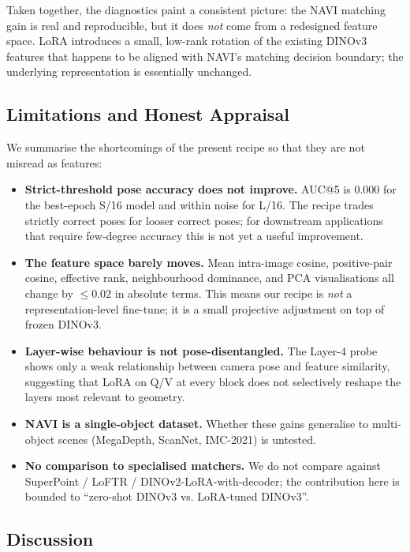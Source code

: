 \documentclass[11pt,a4paper]{article}
\begin{document}
Taken together, the diagnostics paint a consistent picture: the NAVI matching gain is real and
reproducible, but it does \emph{not} come from a redesigned feature space. LoRA introduces a small,
low-rank rotation of the existing DINOv3 features that happens to be aligned with NAVI's matching
decision boundary; the underlying representation is essentially unchanged.

\subsection{Limitations and Honest Appraisal}
\label{sec:limits}

We summarise the shortcomings of the present recipe so that they are not misread as features:

\begin{itemize}
    \item \textbf{Strict-threshold pose accuracy does not improve.} AUC@5 is $0.000$ for the
    best-epoch S/16 model and within noise for L/16. The recipe trades strictly correct poses for
    looser correct poses; for downstream applications that require few-degree accuracy this is not
    yet a useful improvement.
    \item \textbf{The feature space barely moves.} Mean intra-image cosine, positive-pair cosine,
    effective rank, neighbourhood dominance, and PCA visualisations all change by $\le 0.02$ in
    absolute terms. This means our recipe is \emph{not} a representation-level fine-tune; it is a
    small projective adjustment on top of frozen DINOv3.
    \item \textbf{Layer-wise behaviour is not pose-disentangled.} The Layer-4 probe shows only a weak
    relationship between camera pose and feature similarity, suggesting that LoRA on Q/V at every
    block does not selectively reshape the layers most relevant to geometry.
    \item \textbf{NAVI is a single-object dataset.} Whether these gains generalise to multi-object
    scenes (MegaDepth, ScanNet, IMC-2021) is untested.
    \item \textbf{No comparison to specialised matchers.} We do not compare against SuperPoint /
    LoFTR / DINOv2-LoRA-with-decoder; the contribution here is bounded to ``zero-shot DINOv3 vs.
    LoRA-tuned DINOv3''.
\end{itemize}

\subsection{Discussion}
\end{document}
